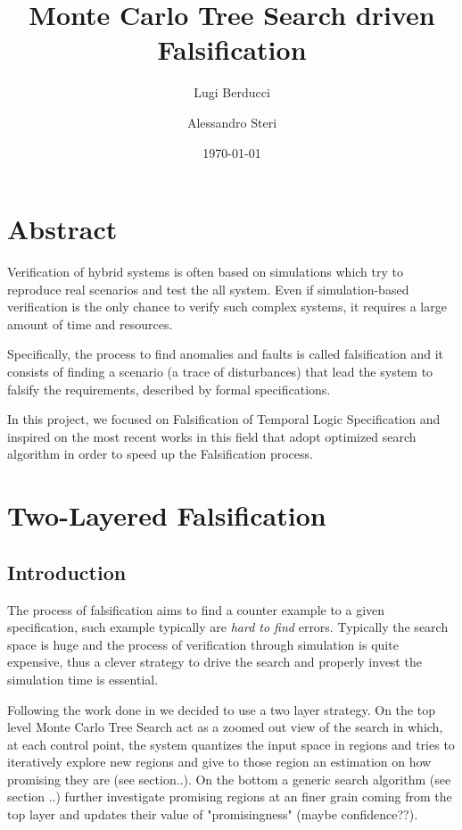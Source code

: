 \documentclass[11pt]{article}
\title{Monte Carlo Tree Search driven Falsification}
\author{Lugi Berducci \and Alessandro Steri}
\date{\today}
\begin{document}
\maketitle	
\pagebreak

\tableofcontents
\pagebreak


\section{Abstract}
Verification of hybrid systems is often based on simulations which try to reproduce real scenarios and test the all system. Even if simulation-based verification is the only chance to verify such complex systems, it requires a large amount of time and resources.

Specifically, the process to find anomalies and faults is called falsification and it consists of finding a scenario (a trace of disturbances) that lead the system to falsify the requirements, described by formal specifications.

In this project, we focused on Falsification of Temporal Logic Specification and inspired on the most recent works in this field that adopt optimized search algorithm in order to speed up the Falsification process.

\pagebreak

\section{Two-Layered Falsification}
\subsection{Introduction}
The process of falsification aims to find a counter example to a given specification, such example typically are \textit{hard to find}  errors. Typically the search space is huge and the process of verification through simulation is quite expensive, thus a clever strategy to drive the search and properly invest the simulation time is essential.

Following the work done in \cite{zhang2018two} we decided to use a two layer strategy. On the top level Monte Carlo Tree Search act as a zoomed out view of the search in which, at each control point, the system quantizes the input space in regions and tries to iteratively explore new regions and give to those region an estimation on how promising they are (see section..). 
On the bottom a generic search algorithm (see section ..) further investigate promising regions at an finer grain coming from the top layer and updates their value of "promisingness" (maybe confidence??).
\end{document}
